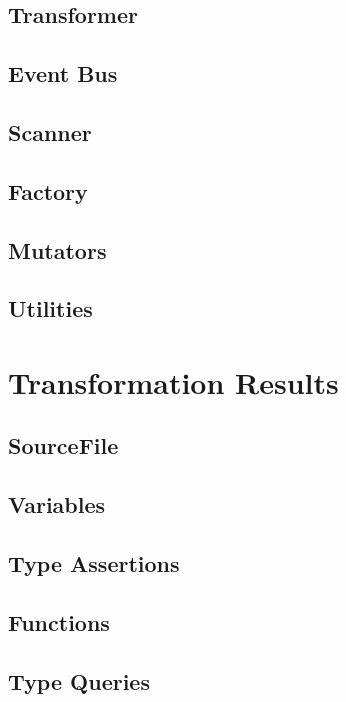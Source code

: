 \subsection{Transformer}

\subsection{Event Bus}

\subsection{Scanner}

\subsection{Factory}

\subsection{Mutators}


\subsection{Utilities}

\section{Transformation Results}
\label{sec:transformation-results}

\subsection{SourceFile}

\subsection{Variables}

\subsection{Type Assertions}

\subsection{Functions}

\subsection{Type Queries}

